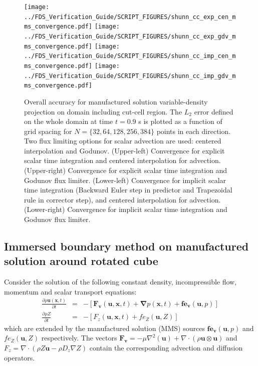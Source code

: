 \documentclass[11pt]{book}
\begin{document}
\begin{figure}[ht]
\centering
\texttt{[image: ../FDS\_Verification\_Guide/SCRIPT\_FIGURES/shunn\_cc\_exp\_cen\_mms\_convergence.pdf]}
\texttt{[image: ../FDS\_Verification\_Guide/SCRIPT\_FIGURES/shunn\_cc\_exp\_gdv\_mms\_convergence.pdf]}
\texttt{[image: ../FDS\_Verification\_Guide/SCRIPT\_FIGURES/shunn\_cc\_imp\_cen\_mms\_convergence.pdf]}
\texttt{[image: ../FDS\_Verification\_Guide/SCRIPT\_FIGURES/shunn\_cc\_imp\_gdv\_mms\_convergence.pdf]}
\caption[The {\ct Shunn CC} accuracy order test case]{Overall accuracy for manufactured solution variable-density projection on domain including cut-cell region. The $L_2$ error defined on the whole domain at time $t = 0.9$ s is plotted as a function of grid spacing for $N=\{32,64,128,256,384\}$ points in each direction. Two flux limiting options for scalar advection are used: centered interpolation and Godunov.  (Upper-left) Convergence for explicit scalar time integration and centered interpolation for advection.  (Upper-right) Convergence for explicit scalar time integration and Godunov flux limiter.  (Lower-left) Convergence for implicit scalar time integration (Backward Euler step in predictor and Trapezoidal rule in corrector step), and  centered interpolation for advection. (Lower-right) Convergence for implicit scalar time integration and Godunov flux limiter.  }\label{fig:shunn_cc_accuracy_order}
\end{figure}


\subsection{Immersed boundary method on manufactured solution around rotated cube}

\label{sec:rotcube_cc_mms}

Consider the solution of the following constant density, incompressible flow, momentum and scalar transport equations:
%
\begin{eqnarray}
  \frac{\partial \rho \mathbf{u}(\mathbf{x},t)}{\partial t} &=& -\left[ \mathbf{F_v}(\mathbf{u},\mathbf{x},t) + \boldsymbol{\nabla} p(\mathbf{x},t) + \mathbf{fe_v}(\mathbf{u},p) \right] \label{eq:mmsMom} \\
  \frac{\partial \rho Z}{\partial t} &=& -\left[  F_z(\mathbf{u},\mathbf{x},t) +  fe_Z(\mathbf{u},Z)   \right]
  \label{eq:mmsZ}
\end{eqnarray}
%
which are extended by the manufactured solution (MMS) sources $\mathbf{fe_v}(\mathbf{u},p)$ and $fe_Z(\mathbf{u},Z)$ respectively. The vectors $\mathbf{F_v}=-\mu \nabla^2(\mathbf{u}) + \nabla \cdot \left( \rho \mathbf{u} \otimes \mathbf{u} \right)$ and $F_z= \nabla \cdot \left( \rho Z \mathbf{u} - \rho D_z \nabla Z \right) $ contain the corresponding advection and diffusion operators.
\end{document}
